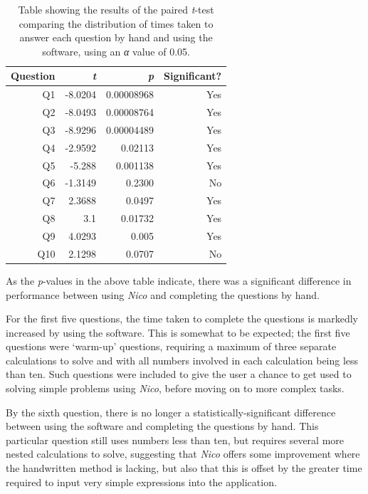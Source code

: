 \documentclass[12pt,twoside,notitlepage,xetex]{report}
\begin{document}
{%
\begin{center}
\begin{table}[H]
\begin{center}
\begin{tabular}{|r|r|r|r|}
\hline
Question & \emph{t} & \emph{p} & Significant?\\ \hline \hline
Q1 & -8.0204 & 0.00008968 & Yes\\ \hline
Q2 & -8.0493 & 0.00008764 & Yes\\ \hline
Q3 & -8.9296 & 0.00004489 & Yes\\ \hline
Q4 & -2.9592 & 0.02113 & Yes\\ \hline
Q5 & -5.288 & 0.001138 & Yes\\ \hline
Q6 & -1.3149 & 0.2300 & No\\ \hline
Q7 & 2.3688 & 0.0497 & Yes\\ \hline
Q8 & 3.1 & 0.01732 & Yes\\ \hline
Q9 & 4.0293 & 0.005 & Yes\\ \hline
Q10 & 2.1298 & 0.0707 & No\\
\hline
\end{tabular}
\end{center}
\caption{Table showing the results of the paired \emph{t}-test comparing the distribution of times taken to answer each question by hand and using the software, using an \emph{α} value of 0.05.}
\label{tab:TTests}
\end{table}
\end{center}

As the \emph{p}-values in the above table indicate, there was a significant difference in performance between using \emph{Nico} and completing the questions by hand.

For the first five questions, the time taken to complete the questions is markedly increased by using the software.  This is somewhat to be expected;  the first five questions were `warm-up' questions, requiring a maximum of three separate calculations to solve and with all numbers involved in each calculation being less than ten.  Such questions were included to give the user a chance to get used to solving simple problems using \emph{Nico}, before moving on to more complex tasks.

By the sixth question, there is no longer a statistically-significant difference between using the software and completing the questions by hand.  This particular question still uses numbers less than ten, but requires several more nested calculations to solve, suggesting that \emph{Nico} offers some improvement where the handwritten method is lacking, but also that this is offset by the greater time required to input very simple expressions into the application.

}
\end{document}
